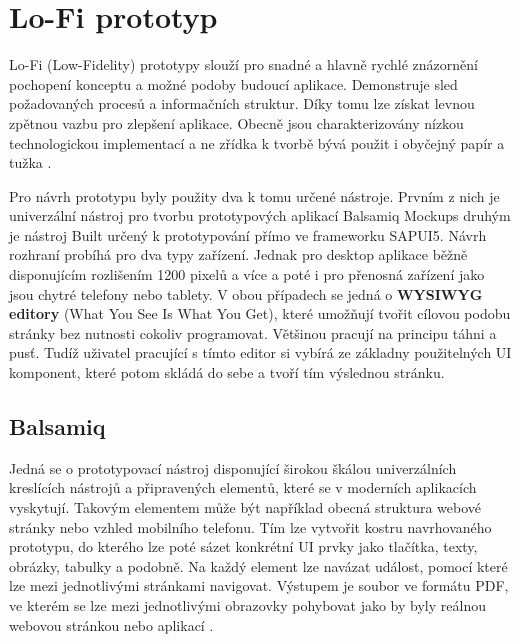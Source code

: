 \documentclass[thesis=M,czech]{FITthesis}[2012/06/26]
\begin{document}
\section{Lo-Fi prototyp}
\label{sec:lofi}
Lo-Fi (Low-Fidelity) prototypy slouží pro snadné a hlavně rychlé znázornění pochopení konceptu a možné podoby budoucí aplikace. Demonstruje sled požadovaných procesů a informačních struktur. Díky tomu lze získat levnou zpětnou vazbu pro zlepšení aplikace. Obecně jsou charakterizovány nízkou technologickou implementací a ne zřídka k tvorbě bývá použit i obyčejný papír a tužka \cite{lofi}. 

Pro návrh prototypu byly použity dva k tomu určené nástroje. Prvním z nich je univerzální nástroj pro tvorbu prototypových aplikací Balsamiq Mockups \cite{balsamiq} druhým je nástroj Built \cite{builtme} určený k prototypování přímo ve frameworku SAPUI5. Návrh rozhraní probíhá pro dva typy zařízení. Jednak pro desktop aplikace běžně disponujícím rozlišením 1200 pixelů a více a poté i pro přenosná zařízení jako jsou chytré telefony nebo tablety. V obou případech se jedná o \textbf{WYSIWYG editory} (What You See Is What You Get), které umožňují tvořit cílovou podobu stránky bez nutnosti cokoliv programovat. Většinou pracují na principu táhni a pusť. Tudíž uživatel pracující s tímto editor si vybírá ze základny použitelných UI komponent, které potom skládá do sebe a tvoří tím výslednou stránku. 
\subsection{Balsamiq}
Jedná se o prototypovací nástroj disponující širokou škálou univerzálních kreslících nástrojů a připravených elementů, které se v moderních aplikacích vyskytují. Takovým elementem může být například obecná struktura webové stránky nebo vzhled mobilního telefonu. Tím lze vytvořit kostru navrhovaného prototypu, do kterého lze poté sázet konkrétní UI prvky jako tlačítka, texty, obrázky, tabulky a podobně. Na každý element lze navázat událost, pomocí které lze mezi jednotlivými stránkami navigovat. Výstupem je soubor ve formátu PDF, ve kterém se lze mezi jednotlivými obrazovky pohybovat jako by byly reálnou webovou stránkou nebo aplikací \cite{balsamiq}. 
\end{document}

